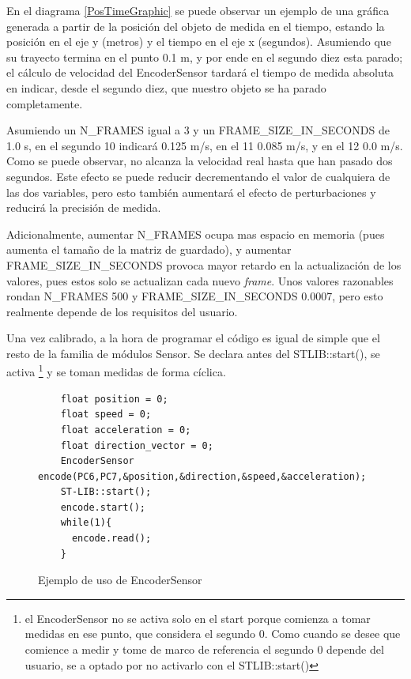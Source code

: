 \documentclass{report}
\begin{document}
\par \vspace{0.3cm}
En el diagrama \ref{PosTimeGraphic} se puede observar un ejemplo de una gráfica generada a partir de la posición del objeto de medida en el tiempo, estando la posición en el eje y (metros) y el tiempo en el eje x (segundos). Asumiendo que su trayecto termina en el punto 0.1 m, y por ende en el segundo diez esta parado; el cálculo de velocidad del EncoderSensor tardará el tiempo de medida absoluta en indicar, desde el segundo diez, que nuestro objeto se ha parado completamente. \par
Asumiendo un N\_FRAMES igual a 3 y un FRAME\_SIZE\_IN\_SECONDS de 1.0 s, en el segundo 10 indicará 0.125 m/s, en el 11 0.085 m/s, y en el 12 0.0 m/s. Como se puede observar, no alcanza la velocidad real hasta que han pasado dos segundos. Este efecto se puede reducir decrementando el valor de cualquiera de las dos variables, pero esto también aumentará el efecto de perturbaciones y reducirá la precisión de medida. \par
Adicionalmente, aumentar N\_FRAMES ocupa mas espacio en memoria (pues aumenta el tamaño de la matriz de guardado), y aumentar FRAME\_SIZE\_IN\_SECONDS provoca mayor retardo en la actualización de los valores, pues estos solo se actualizan cada nuevo \textit{frame}. Unos valores razonables rondan N\_FRAMES 500 y  FRAME\_SIZE\_IN\_SECONDS 0.0007, pero esto realmente depende de los requisitos del usuario. 
\par \vspace{0.3cm}
Una vez calibrado, a la hora de programar el código es igual de simple que el resto de la familia de módulos Sensor. Se declara antes del STLIB::start(), se activa \footnote{el EncoderSensor no se activa solo en el start porque comienza a tomar medidas en ese punto, que considera el segundo 0. Como cuando se desee que comience a medir y tome de marco de referencia el segundo 0 depende del usuario, se a optado por no activarlo con el STLIB::start()} y se toman medidas de forma cíclica. 
\begin{figure}[h]
  \begin{lstlisting}
    float position = 0;
    float speed = 0;
    float acceleration = 0;
    float direction_vector = 0;
    EncoderSensor encode(PC6,PC7,&position,&direction,&speed,&acceleration);
    ST-LIB::start();
    encode.start();
    while(1){
      encode.read();
    }
  \end{lstlisting}
  \caption{Ejemplo de uso de EncoderSensor}
  \label{EncoderSensorCode}
\end{figure}
\end{document}
